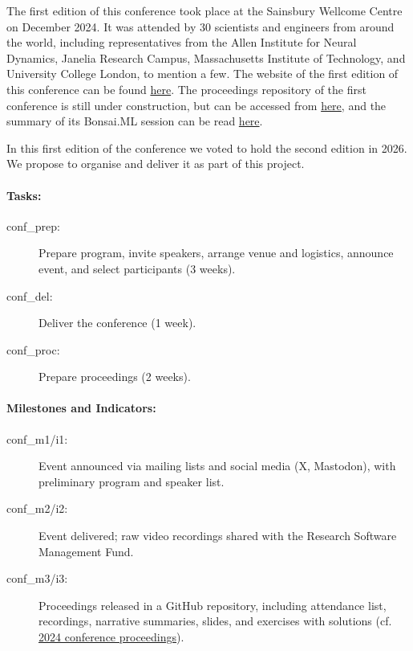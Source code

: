 The first edition of this conference took place at the Sainsbury Wellcome
Centre on December 2024. It was attended by 30 scientists and engineers from
around the world, including representatives from the Allen Institute for Neural
Dynamics, Janelia Research Campus, Massachusetts Institute of Technology, and
University College London, to mention a few.
%
The website of the first edition of this conference  can be found
\href{https://conference.bonsai-rx.org/2024/}{here}.  The proceedings
repository of the first conference is still under construction, but can be
accessed from
\href{https://github.com/joacorapela/bonsaiConference2024Proceedings}{here},
and the summary of its Bonsai.ML session can be read
\href{https://github.com/joacorapela/bonsaiConference2024Proceedings/blob/master/sessions/machineLearning/README.md}{here}.

In this first edition of the conference we voted to hold the second edition in
2026. We propose to organise and deliver it as part of this project.

\paragraph{Tasks:}  

\begin{description}
    \item[conf\_prep:] Prepare program, invite speakers, arrange venue and logistics, announce event, and select participants (3 weeks).  
    \item[conf\_del:] Deliver the conference (1 week).  
    \item[conf\_proc:] Prepare proceedings (2 weeks).  
\end{description}  

\paragraph{Milestones and Indicators:}  

\begin{description}
    \item[conf\_m1/i1:] Event announced via mailing lists and social media (X, Mastodon), with preliminary program and speaker list.  
    \item[conf\_m2/i2:] Event delivered; raw video recordings shared with the Research Software Management Fund.  
    \item[conf\_m3/i3:] Proceedings released in a GitHub repository, including attendance list, recordings, narrative summaries, slides, and exercises with solutions (cf. \href{https://github.com/joacorapela/bonsaiConference2024Proceedings}{2024 conference proceedings}).  
\end{description}

